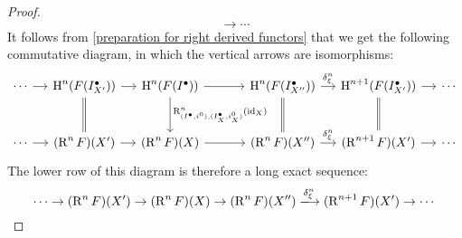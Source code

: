\begin{proof}
\[    \to
    \dotsb
  \]
  It follows from \cref{preparation for right derived functors} that we get the following commutative diagram, in which the vertical arrows are isomorphisms:
  \[
    \begin{tikzcd}[column sep = small, row sep = large]
        \dotsb
        \arrow{r}
      & \Hl^n(F(\Iccc_{X'}))
        \arrow{r}
        \arrow[equal]{d}
      & \Hl^n(F(\Iccc))
        \arrow{rr}
        \arrow{d}[right]{\Right^n_{(\Iccc, i^0),(\Iccc_X, i_X^0)}(\id_X)}
      & {}
      & \Hl^n(F(\Iccc_{X''}))
        \arrow{r}[above]{\delta^n_\xi}
        \arrow[equal]{d}
      & \Hl^{n+1}(F(\Iccc_{X'}))
        \arrow{r}
        \arrow[equal]{d}
      & \dotsb
      \\
        \dotsb
        \arrow{r}
      & (\Right^n F)(X')
        \arrow{r}
      & (\Right^n F)(X)
        \arrow{rr}
      & {}
      & (\Right^n F)(X'')
        \arrow{r}[above]{\delta^n_\xi}
      & (\Right^{n+1} F)(X')
        \arrow{r}
      & \dotsb
    \end{tikzcd}
  \]
  The lower row of this diagram is therefore a long exact sequence:
  \[
    \dotsb
    \to
    (\Right^n F)(X')
    \to
    (\Right^n F)(X)
    \to
    (\Right^n F)(X'')
    \xlongto{ \delta^n_\xi }
    (\Right^{n+1} F)(X')
    \to
    \dotsb
  \]
  

\end{proof}
